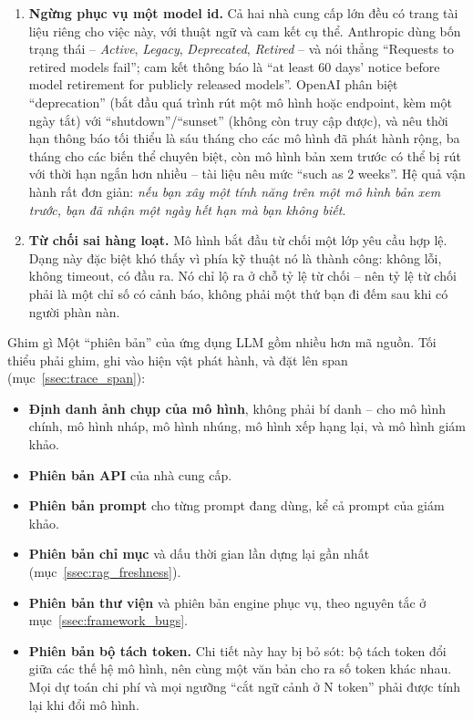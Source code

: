 \begin{enumerate}
	\item \textbf{Ngừng phục vụ một model id.} Cả hai nhà cung cấp lớn đều có trang tài liệu riêng cho việc này, với thuật ngữ và cam kết cụ thể. Anthropic dùng bốn trạng thái -- \emph{Active}, \emph{Legacy}, \emph{Deprecated}, \emph{Retired} -- và nói thẳng ``Requests to retired models fail''; cam kết thông báo là ``at least 60 days' notice before model retirement for publicly released models''. OpenAI phân biệt ``deprecation'' (bắt đầu quá trình rút một mô hình hoặc endpoint, kèm một ngày tắt) với ``shutdown''/``sunset'' (không còn truy cập được), và nêu thời hạn thông báo tối thiểu là sáu tháng cho các mô hình đã phát hành rộng, ba tháng cho các biến thể chuyên biệt, còn mô hình bản xem trước có thể bị rút với thời hạn ngắn hơn nhiều -- tài liệu nêu mức ``such as 2 weeks''. Hệ quả vận hành rất đơn giản: \emph{nếu bạn xây một tính năng trên một mô hình bản xem trước, bạn đã nhận một ngày hết hạn mà bạn không biết}.
	\item \textbf{Từ chối sai hàng loạt.} Mô hình bắt đầu từ chối một lớp yêu cầu hợp lệ. Dạng này đặc biệt khó thấy vì phía kỹ thuật nó là thành công: không lỗi, không timeout, có đầu ra. Nó chỉ lộ ra ở chỗ tỷ lệ từ chối -- nên tỷ lệ từ chối phải là một chỉ số có cảnh báo, không phải một thứ bạn đi đếm sau khi có người phàn nàn.
\end{enumerate}

\begin{keyidea}{Ghim gì}
Một ``phiên bản'' của ứng dụng LLM gồm nhiều hơn mã nguồn. Tối thiểu phải ghim, ghi vào hiện vật phát hành, và đặt lên span (mục~\ref{ssec:trace_span}):

\begin{itemize}
	\item \textbf{Định danh ảnh chụp của mô hình}, không phải bí danh -- cho mô hình chính, mô hình nháp, mô hình nhúng, mô hình xếp hạng lại, và mô hình giám khảo.
	\item \textbf{Phiên bản API} của nhà cung cấp.
	\item \textbf{Phiên bản prompt} cho từng prompt đang dùng, kể cả prompt của giám khảo.
	\item \textbf{Phiên bản chỉ mục} và dấu thời gian lần dựng lại gần nhất (mục~\ref{ssec:rag_freshness}).
	\item \textbf{Phiên bản thư viện} và phiên bản engine phục vụ, theo nguyên tắc ở mục~\ref{ssec:framework_bugs}.
	\item \textbf{Phiên bản bộ tách token.} Chi tiết này hay bị bỏ sót: bộ tách token đổi giữa các thế hệ mô hình, nên cùng một văn bản cho ra số token khác nhau. Mọi dự toán chi phí và mọi ngưỡng ``cắt ngữ cảnh ở N token'' phải được tính lại khi đổi mô hình.
\end{itemize}
\end{keyidea}

